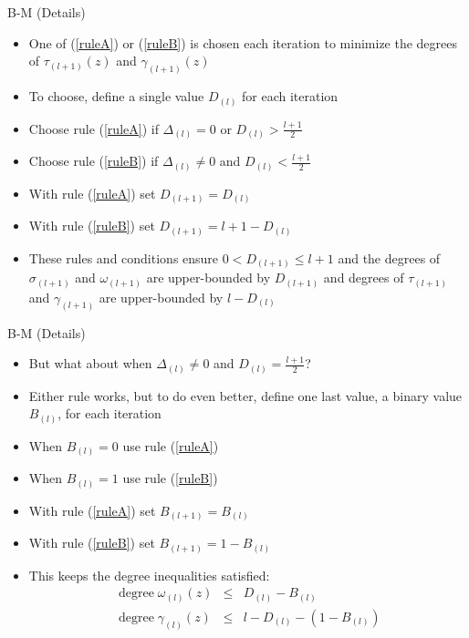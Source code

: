 \documentclass[]{prosper}
\begin{document}
\begin{slide}{B-M (Details)}
\begin{itemize}
    \item One of (\ref{ruleA}) or (\ref{ruleB}) is chosen each iteration to minimize the degrees of $\tau_{(l+1)}(z)$ and $\gamma_{(l+1)}(z)$
    \item To choose, define a single value $D_{(l)}$ for each iteration
    \item Choose rule (\ref{ruleA}) if $\Delta_{(l)} = 0$ or $D_{(l)} > \frac{l+1}{2}$
    \item Choose rule (\ref{ruleB}) if $\Delta_{(l)} \ne 0$ and $D_{(l)} < \frac{l+1}{2}$
    \item With rule (\ref{ruleA}) set $D_{(l+1)} = D_{(l)}$
    \item With rule (\ref{ruleB}) set $D_{(l+1)} = l + 1 - D_{(l)}$
    \item These rules and conditions ensure $0 < D_{(l+1)} \le l+1$ and the degrees of $\sigma_{(l+1)}$ and $\omega_{(l+1)}$ are upper-bounded by $D_{(l+1)}$ and degrees of $\tau_{(l+1)}$ and $\gamma_{(l+1)}$ are upper-bounded by $l - D_{(l)}$
\end{itemize}
\end{slide}

\begin{slide}{B-M (Details)}
\begin{itemize}
    \item But what about when $\Delta_{(l)} \ne 0$ and $D_{(l)} = \frac{l+1}{2}$?
    \item Either rule works, but to do even better, define one last value, a binary value $B_{(l)}$, for each iteration
    \item When $B_{(l)} = 0$ use rule (\ref{ruleA})
    \item When $B_{(l)} = 1$ use rule (\ref{ruleB})
    \item With rule (\ref{ruleA}) set $B_{(l+1)} = B_{(l)}$
    \item With rule (\ref{ruleB}) set $B_{(l+1)} = 1 - B_{(l)}$
    \item This keeps the degree inequalities satisfied:
    \begin{eqnarray*}
        \operatorname{degree} \omega_{(l)}(z) &\le& D_{(l)} - B_{(l)} \\
        \operatorname{degree} \gamma_{(l)}(z) &\le& l - D_{(l)} - (1 - B_{(l)})
    \end{eqnarray*}
\end{itemize}
\end{slide}
\end{document}
